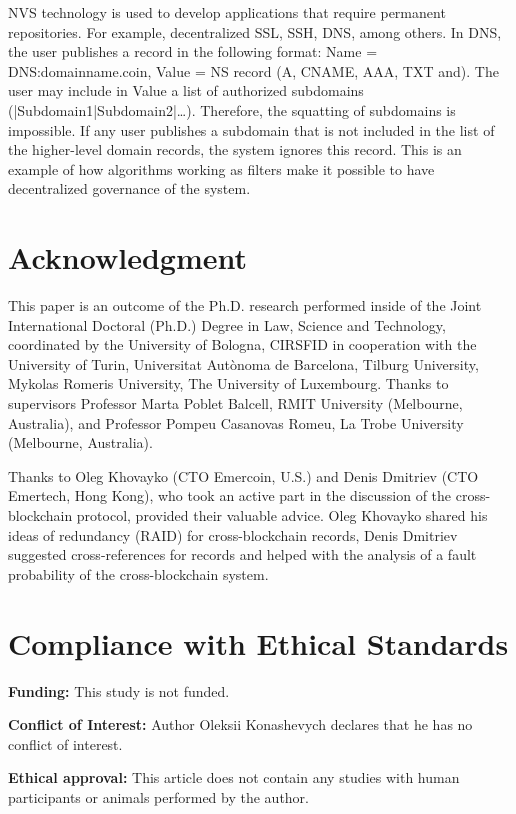 \begin{multicols}{2}
NVS technology is used to develop applications that require permanent repositories. For example, decentralized SSL, SSH, DNS, among others. In DNS, the user publishes a record in the following format: Name = DNS:domainname.coin, Value = NS record (A, CNAME, AAA, TXT and). The user may include in Value a list of authorized subdomains (|Subdomain1|Subdomain2|…). Therefore, the squatting of subdomains is impossible. If any user publishes a subdomain that is not included in the list of the higher-level domain records, the system ignores this record. This is an example of how algorithms working as filters make it possible to have decentralized governance of the system.

\section*{Acknowledgment}

This paper is an outcome of the Ph.D. research performed inside of the Joint International Doctoral (Ph.D.) Degree in Law, Science and Technology, coordinated by the University of Bologna, CIRSFID in cooperation with the University of Turin, Universitat Autònoma de Barcelona, Tilburg University, Mykolas Romeris University, The University of Luxembourg. Thanks to supervisors Professor Marta Poblet Balcell, RMIT University (Melbourne, Australia), and Professor Pompeu Casanovas Romeu, La Trobe University (Melbourne, Australia).

Thanks to Oleg Khovayko (CTO Emercoin, U.S.) and Denis Dmitriev (CTO Emertech, Hong Kong), who took an active part in the discussion of the cross-blockchain protocol, provided their valuable advice. Oleg Khovayko shared his ideas of redundancy (RAID) for cross-blockchain records, Denis Dmitriev suggested cross-references for records and helped with the analysis of a fault probability of the cross-blockchain system.

\section*{Compliance with Ethical Standards}

\textbf{Funding:} This study is not funded.

\textbf{Conflict of Interest:} Author Oleksii Konashevych declares that he has no conflict of interest.

\textbf{Ethical approval:} This article does not contain any studies with human participants or animals performed by the author.


\end{multicols}
